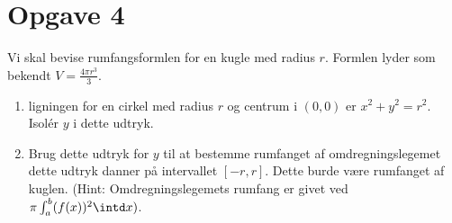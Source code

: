 \section*{Opgave 4}
Vi skal bevise rumfangsformlen for en kugle med radius $r$. Formlen lyder som bekendt $V = \frac{4\pi r^3}{3}$.
\begin{enumerate}[label=\roman*)]
\item ligningen for en cirkel med radius $r$ og centrum i $(0,0)$ er $x^2+y^2 = r^2$. Isolér $y$ i dette udtryk. 
\item Brug dette udtryk for $y$ til at bestemme rumfanget af omdregningslegemet dette udtryk danner på intervallet $[-r,r]$. Dette burde være rumfanget af kuglen. (Hint: Omdregningslegemets rumfang er givet ved $\pi \int_a^b(f(x))^2\intd x)$.
\end{enumerate}
